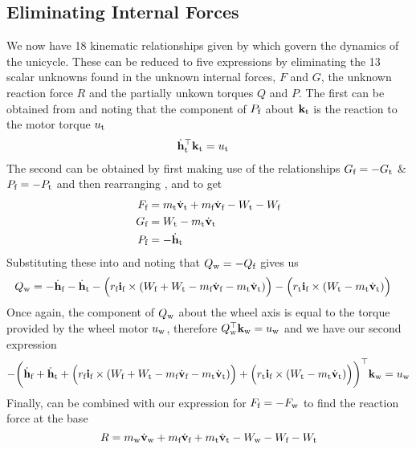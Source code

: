\subsection{Eliminating Internal Forces}
We now have 18 kinematic relationships given by  which govern the dynamics of the unicycle. These can be reduced to five expressions by eliminating the 13 scalar unknowns found in the unknown internal forces, $F$ and $G$, the unknown reaction force $R$ and the partially unkown torques $Q$ and $P$. The first can be obtained from  and noting that the component of $P_{\text{f}}$ about $\mathbf{k}_{\text{t}}$ is the reaction to the motor torque $u_{\text{t}}$
\begin{align}
\dot{\mathbf{h}}_{\text{t}}^\top\mathbf{k}_{\text{t}} &= u_{\text{t}} \label{eqn:uniE1} 
\end{align}
The second can be obtained by first making use of the relationships $G_{\text{f}}=-G_{\text{t}}$ \& $P_{\text{f}}=-P_{\text{t}}$ and then rearranging ,  and  to get
\begin{align*}
F_{\text{f}} &= m_{\text{t}}\dot{\mathbf{v}}_{\text{t}} + m_{\text{f}}\dot{\mathbf{v}}_{\text{f}} -W_{\text{t}} - W_{\text{f}} \\
G_{\text{f}} &= W_{\text{t}} - m_{\text{t}}\dot{\mathbf{v}}_{\text{t}} \\
P_{\text{f}} &= -\dot{\mathbf{h}}_{\text{t}}
\end{align*}
Substituting these into  and noting that $Q_{\text{w}}=-Q_{\text{f}}$ gives us
\begin{align*}
Q_{\text{w}} &= -\dot{\mathbf{h}}_{\text{f}} -\dot{\mathbf{h}}_{\text{t}} - \Big( r_{\text{f}}\mathbf{i}_{\text{f}} \times (W_{\text{f}}+W_{\text{t}} - m_{\text{f}}\dot{\mathbf{v}}_{\text{f}} - m_{\text{t}}\dot{\mathbf{v}}_{\text{t}}) \Big) - \Big(r_{\text{t}}\mathbf{i}_{\text{f}} \times (W_{\text{t}}-m_{\text{t}}\dot{\mathbf{v}}_{\text{t}})\Big)
\end{align*}
Once again, the component of $Q_{\text{w}}$ about the wheel axis is equal to the torque provided by the wheel motor $u_{\text{w}}$, therefore $Q_{\text{w}}^\top\mathbf{k}_{\text{w}} = u_{\text{w}}$ and we have our second expression
\begin{align}
-\bigg(\dot{\mathbf{h}}_{\text{f}} +\dot{\mathbf{h}}_{\text{t}} + \Big( r_{\text{f}}\mathbf{i}_{\text{f}} \times (W_{\text{f}}+W_{\text{t}} - m_{\text{f}}\dot{\mathbf{v}}_{\text{f}} - m_{\text{t}}\dot{\mathbf{v}}_{\text{t}}) \Big) + \Big(r_{\text{t}}\mathbf{i}_{\text{f}} \times (W_{\text{t}}-m_{\text{t}}\dot{\mathbf{v}}_{\text{t}})\Big) \bigg)^\top \mathbf{k}_{\text{w}} = u_{\text{w}}
 \label{eqn:uniE2} 
\end{align}
Finally,  can be combined with our expression for $F_{\text{f}}=-F_{\text{w}}$ to find the reaction force at the base
\begin{equation*}
R = m_{\text{w}}\dot{\mathbf{v}}_{\text{w}} + m_{\text{f}}\dot{\mathbf{v}}_{\text{f}} + m_{\text{t}}\dot{\mathbf{v}}_{\text{t}} -W_{\text{w}} - W_{\text{f}} - W_{\text{t}}
\end{equation*}
